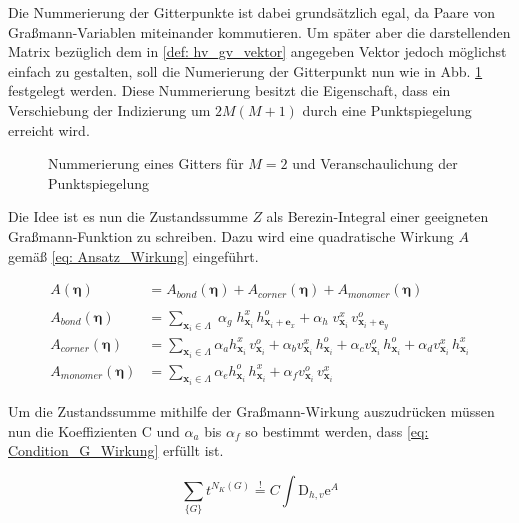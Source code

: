  \noindent Die Nummerierung der Gitterpunkte ist dabei grundsätzlich egal, da Paare von Graßmann-Variablen miteinander kommutieren. Um später aber die darstellenden Matrix bezüglich dem in \eqref{def: hv_gv_vektor} angegeben Vektor jedoch möglichst einfach zu gestalten, soll die Numerierung der Gitterpunkt nun wie in Abb. \ref{Abb: Numerierung} festgelegt werden. Diese Nummerierung besitzt die Eigenschaft, dass ein Verschiebung der Indizierung um $2M(M+1)$ durch eine Punktspiegelung erreicht wird. 
\begin{figure}[h!]
\centering

\caption{Nummerierung eines Gitters für $M=2$ und Veranschaulichung der Punktspiegelung}
\label{Abb: Numerierung}
\end{figure}

\noindent Die Idee ist es nun die Zustandssumme $Z$ als Berezin-Integral einer geeigneten Graßmann-Funktion zu schreiben. Dazu wird eine quadratische Wirkung $A$ gemäß \eqref{eq: Ansatz_Wirkung} eingeführt.

\begin{equation} \label{eq: Ansatz_Wirkung}
    \begin{aligned}
        A(\bm{\eta})  &= A_{bond}(\bm{\eta}) + A_{corner}(\bm{\eta}) + A_{monomer}(\bm{\eta}) \\
                 &\\
        A_{bond}(\bm{\eta}) &= \sum_{\bm{x}_i \in \Lambda} 
            \; \alpha_g \; h_{\bm{x}_i}^x \,h_{\bm{x}_i+\bm{e}_x}^o
            + \alpha_h \; v_{\bm{x}_i}^x \,v_{\bm{x}_i+\bm{e}_y}^o \\
        A_{corner}(\bm{\eta}) &= \sum_{\bm{x}_i \in \Lambda}  
            \alpha_a h_{\bm{x}_i}^x \,v_{\bm{x}_i}^o  
            + \alpha_b v_{\bm{x}_i}^x\, h_{\bm{x}_i}^o 
            + \alpha_c v_{\bm{x}_i}^o \,h_{\bm{x}_i}^o 
            + \alpha_d v_{\bm{x}_i}^x \,h_{\bm{x}_i}^x\\
        A_{monomer}(\bm{\eta}) &= \sum_{\bm{x}_i \in \Lambda} 
            \alpha_e h_{\bm{x}_i}^o \,h_{\bm{x}_i}^x 
            + \alpha_f v_{\bm{x}_i}^o \,v_{\bm{x}_i}^x
    \end{aligned}
\end{equation}

\noindent Um die Zustandssumme mithilfe der Graßmann-Wirkung auszudrücken müssen nun die Koeffizienten C und $\alpha_a$ bis $\alpha_f$ so bestimmt werden, dass \eqref{eq: Condition_G_Wirkung} erfüllt ist.

\begin{equation} \label{eq: Condition_G_Wirkung}
\sum_{\{ G\}} t^{N_K(G)} \overset{!}{=} C \int \mathrm{D}_{h,v} \mathrm{e}^A
\end{equation}

